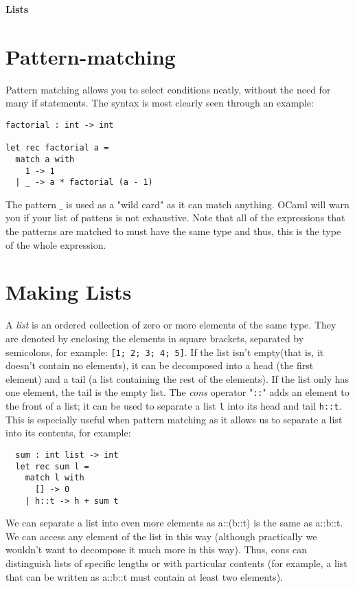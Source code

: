 \documentclass[12pt]{article}
\begin{document}
\begin{center}\LARGE\bf
    Lists
\end{center}

\section{Pattern-matching}
Pattern matching allows you to select conditions neatly, without the need for many if statements. The
syntax is most clearly seen through an example:
\begin{lstlisting}
factorial : int -> int

let rec factorial a =
  match a with
    1 -> 1
  | _ -> a * factorial (a - 1)
\end{lstlisting}
The pattern $\_$ is used as a "wild card" as it can match anything. OCaml will warn you if your list of pattens is not
exhaustive. Note that all of the expressions that the patterns are matched to must have the same type and
thus, this is the type of the whole expression.

\section{Making Lists}
A \textit{list} is an ordered collection of zero or more elements of the same type. They are denoted by enclosing the elements in
square brackets, separated by semicolons, for example: \texttt{[1; 2; 3; 4; 5]}. If the list isn't empty(that is, it
doesn't contain no elements), it can be decomposed into a head (the first element) and a tail (a list containing the rest of the elements).
If the list only has one element, the tail is the empty list.
The \textit{cons} operator "\texttt{::}" adds an element to the front of a list; it can be used to separate a list \texttt{l}
into its head and tail \texttt{h::t}. This is especially useful when pattern matching as it allows us to separate
a list into its contents, for example:
\begin{lstlisting}
  sum : int list -> int
  let rec sum l =
    match l with
      [] -> 0
    | h::t -> h + sum t
\end{lstlisting}

We can separate a list into even more elements as a::(b::t) is the same as a::b::t. We can access any element of the
list in this way (although practically we wouldn't want to decompose it much more in this way). Thus, cons can distinguish lists of
specific lengths or with particular contents (for example, a list that can be written as a::b::t must contain at least two
elements).
\end{document}

